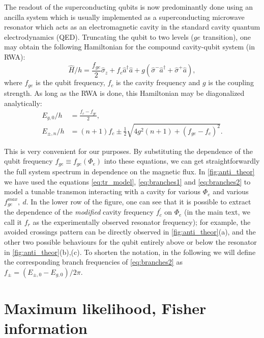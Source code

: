 \documentclass[%
 aip,
 amsmath,amssymb,
 reprint,%
]{revtex4-1}
\begin{document}
The readout of the superconducting qubits is now predominantly done using an ancilla system which is usually implemented as a superconducting microwave resonator which acts as an electromagnetic cavity in the standard cavity quantum electrodynamics (QED). Truncating the qubit to two levels ($ge$ transition), one may obtain the following Hamiltonian for the compound cavity-qubit system (in RWA):
\begin{equation}
\hat H/h = \frac{f_{ge}}{2} \hat \sigma_z + f_c \hat a^\dagger \hat a + g(\hat \sigma^- \hat a^\dagger + \hat \sigma^+ \hat a),
\end{equation}
where $f_{ge}$ is the qubit frequency, $f_c$ is the cavity frequency and $g$ is the coupling strength. As long as the RWA is done, this Hamiltonian may be diagonalized analytically\cite{blais2004}:
\begin{align}
E_{g, 0}/h &= \frac{f_c - f_{ge}}{2},\label{eq:branches1}
\\
E_{\pm, n}/h &= (n+1)f_c \pm \frac{1}{2}\sqrt{4g^2(n+1)+(f_{ge}-f_c)^2}.
\label{eq:branches2}
\end{align}

This is very convenient for our purposes. By substituting the dependence of the qubit frequency $f_{ge} \equiv f_{ge}(\Phi_e)$ into these equations, we can get straightforwardly the full system spectrum in dependence on the magnetic flux. In \autoref{fig:anti_theor} we have used the equations \eqref{eq:tr_model}, \eqref{eq:branches1} and \eqref{eq:branches2} to model a tunable transmon interacting with a cavity for various $\Phi_e$ and various $f_{ge}^{max},\ d$. In the lower row of the figure, one can see that it is possible to extract the dependence of the \textit{modified} cavity frequency $f_c^\prime$ on $\Phi_e$ (in the main text, we call it $f_r$ as the experimentally observed resonator frequency); for example, the avoided crossings pattern can be directly observed in \autoref{fig:anti_theor}(a), and the other two possible behaviours for the qubit entirely above or below the resonator in \autoref{fig:anti_theor}(b),(c). To shorten the notation, in the following we will define the corresponding branch frequencies of \eqref{eq:branches2} as $f_{\pm} = ( E_{\pm,0}-E_{g,0})/2\pi$.

\section{Maximum likelihood, Fisher information}\label{sec:ML}
\end{document}
